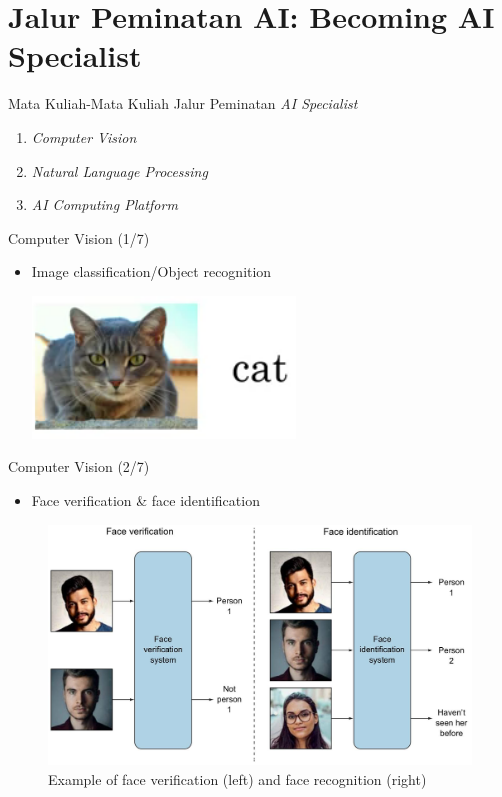 \documentclass[pdf]{beamer}
\theoremstyle{mystyle}
\begin{document}
\section{Jalur Peminatan AI: Becoming AI Specialist}
\begin{frame}{Mata Kuliah-Mata Kuliah Jalur Peminatan \textit{AI Specialist}}
	\begin{enumerate}
		\item \textit{Computer Vision}
		\bigskip
		\item \textit{Natural Language Processing}
		\bigskip
		\item \textit{AI Computing Platform}
	\end{enumerate}	
\end{frame}

\begin{frame}{Computer Vision (1/7)}
	\begin{itemize}
		\item Image classification/Object recognition 
		\begin{center}
			\includegraphics[scale=.4]{image-classification}	
		\end{center}
	\end{itemize}
\end{frame}

\begin{frame}{Computer Vision (2/7)}
	\begin{itemize}
		\item Face verification \& face identification
	\end{itemize}	
	\begin{figure}[!ht]
	\centering
	\includegraphics[scale=.232]{images/face-identification-recognition.jpg}
	\caption{Example of face verification (left) and face recognition (right) \citep{elgendy2020deeplearning4vision}}
\end{figure}
\end{frame}
\end{document}
